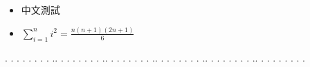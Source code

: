 \begin{itemize}
\item 中文測試 
\item $\sum \limits_{i=1}^n i^2 = \frac{n(n+1)(2n+1)}{6}$
\end{itemize}
.
.
.
.
.
.
.
.
..
.
.
.
.
.
.
.
..
.
.
.
.
.
.
.
..
.
.
.
.
.
.
.
..
.
.
.
.
.
.
.
..
.
.
.
.
.
.
.
.
